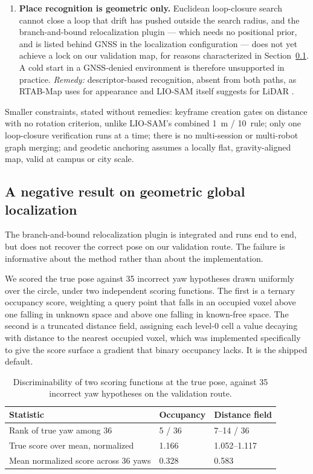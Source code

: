 \documentclass[conference]{IEEEtran}
\begin{document}
\begin{enumerate}
    \item \textbf{Place recognition is geometric only.} Euclidean loop-closure search cannot close a loop that drift has pushed outside the search radius, and the branch-and-bound relocalization plugin --- which needs no positional prior, and is listed behind GNSS in the localization configuration --- does not yet achieve a lock on our validation map, for reasons characterized in Section~\ref{sec:negative}. A cold start in a GNSS-denied environment is therefore unsupported in practice. \emph{Remedy:} descriptor-based recognition, absent from both paths, as RTAB-Map uses for appearance \parencite{labbe2019rtabmap} and LIO-SAM itself suggests for LiDAR \parencite{shan2020liosam}.
\end{enumerate}

Smaller constraints, stated without remedies: keyframe creation gates on distance with no rotation criterion, unlike LIO-SAM's combined 1~m / 10\textdegree\ rule; only one loop-closure verification runs at a time; there is no multi-session or multi-robot graph merging; and geodetic anchoring assumes a locally flat, gravity-aligned map, valid at campus or city scale.

\subsection{A negative result on geometric global localization}
\label{sec:negative}
The branch-and-bound relocalization plugin is integrated and runs end to end, but does not
recover the correct pose on our validation route. The failure is informative about the method
rather than about the implementation.

We scored the true pose against 35 incorrect yaw hypotheses drawn uniformly over the circle,
under two independent scoring functions. The first is a ternary occupancy score, weighting a
query point that falls in an occupied voxel above one falling in unknown space and above one
falling in known-free space. The second is a truncated distance field, assigning each level-0
cell a value decaying with distance to the nearest occupied voxel, which was implemented
specifically to give the score surface a gradient that binary occupancy lacks. It is the shipped
default.

\begin{table}[t]
\centering
\footnotesize
\caption{Discriminability of two scoring functions at the true pose, against 35 incorrect yaw
hypotheses on the validation route.}
\label{tab:scoring}
\begin{tabular}{@{}p{3.3cm}p{1.6cm}p{2.2cm}@{}}
\toprule
Statistic & Occupancy & Distance field \\
\midrule
Rank of true yaw among 36 & 5 / 36 & 7--14 / 36 \\
True score over mean, normalized & 1.166 & 1.052--1.117 \\
Mean normalized score across 36 yaws & 0.328 & 0.583 \\
\bottomrule
\end{tabular}
\end{table}
\end{document}
